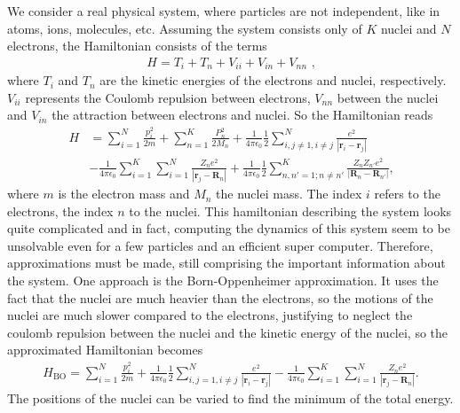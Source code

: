 \documentclass[twoside,        %
			   12pt,			%
               BCOR10mm,       %
               ngerman,english  %
               ]{scrartcl}
\begin{document}
We consider a real physical system, where particles are not independent, like in atoms, ions, molecules, etc. Assuming the system consists only of $K$ nuclei and $N$ electrons, the Hamiltonian consists of the terms
\begin{align*}
    H = T_i + T_n+ V_{ii} + V_{in} + V_{nn} \text{ ,}
\end{align*} 
where $T_i $ and $T_n$ are the kinetic energies of the electrons and nuclei, respectively. $V_{ii}$ represents the Coulomb repulsion between electrons, $V_{nn}$ between the nuclei and $V_{in}$  the attraction between electrons and nuclei. So the Hamiltonian reads
\begin{align*}
    H &= \sum_{i=1}^N \frac{p_i^2}{2m} + \sum_{n=1}^K \frac{P_n^2}{2M_n} + \frac{1}{4\pi \epsilon_0}\frac{1}{2}\sum_{i,j\neq 1, i \neq j}^N \frac{e^2}{|\mathbf{r}_i - \mathbf{r}_j|} \\ &-  \frac{1}{4\pi \epsilon_0}\sum_{i=1}^K \sum_{i=1}^N \frac{Z_n e^2}{|\mathbf{r}_j-\mathbf{R}_n|} +  \frac{1}{4\pi \epsilon_0}\frac{1}{2} \sum_{n,n'=1;n\neq n'}^K \frac{Z_n Z_{n'} e^2}{|\mathbf{R}_n - \mathbf{R}_{n'}|} \text{,}
\end{align*} where $m$ is the electron mass and $M_n$ the nuclei mass. The index $i$ refers to the electrons, the index $n$ to the nuclei.
This hamiltonian describing the system looks quite complicated and in fact, computing the dynamics of this system seem to be unsolvable even for a few particles and an efficient super computer. Therefore, approximations must be made, still comprising the important information about the system. One approach is the Born-Oppenheimer approximation. It uses the fact that the nuclei are much heavier than the electrons, so the motions of the nuclei are much slower compared to the electrons, justifying to neglect the coulomb repulsion between the nuclei and the kinetic energy of the nuclei, so the approximated Hamiltonian becomes
\begin{align}\label{eq:H_BO}
H_\text{BO} = \sum_{i=1}^N \frac{p_i^2}{2m}  + \frac{1}{4\pi \epsilon_0}\frac{1}{2}\sum_{i,j = 1, i \neq j}^N \frac{e^2}{|\mathbf{r}_i - \mathbf{r}_j|} -  \frac{1}{4\pi \epsilon_0}\sum_{i=1}^K \sum_{i=1}^N \frac{Z_n e^2}{|\mathbf{r}_j-\mathbf{R}_n|}  \text{.}
\end{align}  
The positions of the nuclei can be varied to find the minimum of the total energy.
\end{document}
